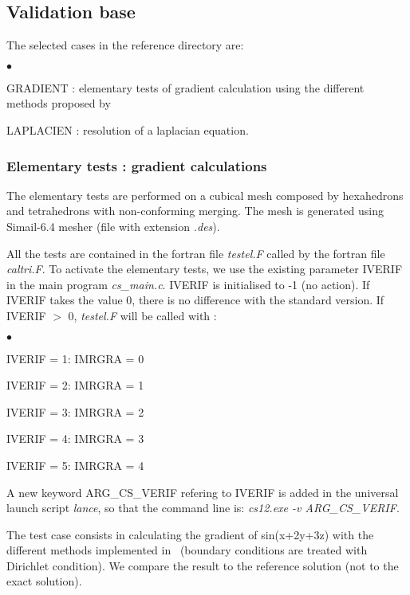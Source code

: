 \subsection{Validation base} 

The selected cases in the reference directory are:
\begin{list}{$\bullet$}{}
\item GRADIENT : elementary tests of gradient calculation using the
      different methods proposed by \CS\,
\item LAPLACIEN : resolution of a laplacian equation.
\end{list}

\subsubsection{Elementary tests : gradient calculations} 
The elementary tests are performed on a cubical mesh composed by
hexahedrons and tetrahedrons with non-conforming merging. The mesh is 
generated using Simail-6.4 mesher (file with extension {\it .des}).
   
All the tests are contained in the fortran file {\it testel.F} called by
the fortran file {\it caltri.F}. To activate the elementary tests, 
we use the existing parameter IVERIF in the main program {\it
cs\_main.c}. IVERIF is initialised to -1 (no action). If IVERIF takes
the value 0, there is no difference with the standard version. If
IVERIF $>$ 0, {\it testel.F} will be called with :
\begin{list}{$\bullet$}{}
\item IVERIF = 1: IMRGRA = 0 
\item IVERIF = 2: IMRGRA = 1 
\item IVERIF = 3: IMRGRA = 2 
\item IVERIF = 4: IMRGRA = 3 
\item IVERIF = 5: IMRGRA = 4
\end{list}

A new keyword ARG\_CS\_VERIF refering to IVERIF is added in the
universal launch script {\it lance}, so that the command line is:
{\it cs12.exe -v ARG\_CS\_VERIF}.

The test case consists in calculating the gradient of sin(x+2y+3z) 
with the different methods implemented in \CS\ (boundary conditions
are treated with Dirichlet condition). We compare the result to the
reference solution (not to the exact solution).


